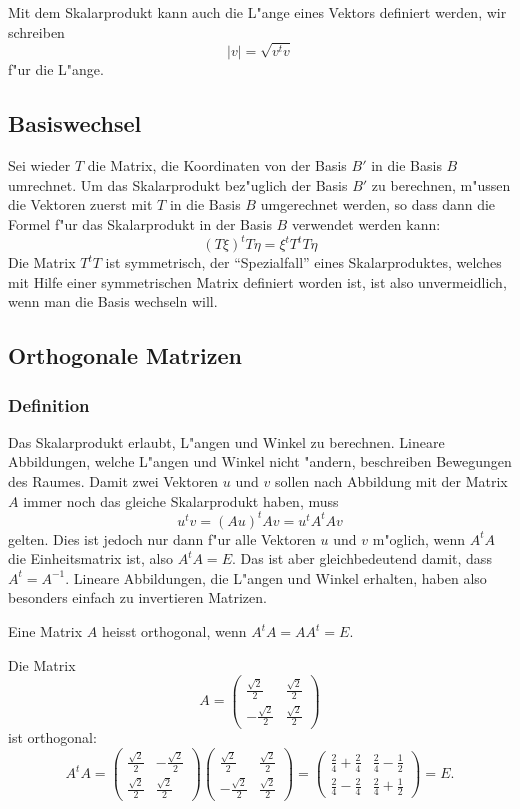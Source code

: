 Mit dem Skalarprodukt kann auch die L"ange eines Vektors definiert 
werden, wir schreiben
\[
|v|=\sqrt{v^tv}
\]
f"ur die L"ange.

\subsection{Basiswechsel}
Sei wieder $T$ die Matrix, die Koordinaten von der Basis $B'$ in die
Basis $B$ umrechnet.
Um das Skalarprodukt bez"uglich der Basis $B'$ zu berechnen,
m"ussen die Vektoren zuerst mit $T$ in die Basis $B$ umgerechnet werden,
so dass dann die Formel f"ur das Skalarprodukt in der Basis $B$
verwendet werden kann:
\[
(T\xi)^tT\eta=\xi^tT^tT\eta
\]
Die Matrix $T^tT$ ist symmetrisch, der ``Spezialfall'' eines Skalarproduktes,
welches mit Hilfe einer symmetrischen Matrix definiert worden ist,
ist also unvermeidlich, wenn man die Basis wechseln will.

\subsection{Orthogonale Matrizen}
\subsubsection{Definition}
Das Skalarprodukt erlaubt, L"angen und Winkel zu berechnen. 
Lineare Abbildungen, welche L"angen und Winkel nicht "andern, beschreiben
Bewegungen des Raumes. Damit zwei Vektoren $u$ und $v$ sollen nach Abbildung
mit der Matrix $A$ immer noch das gleiche Skalarprodukt haben, muss
\[
u^tv=(Au)^tAv=u^tA^tAv
\]
gelten. Dies ist jedoch nur dann f"ur alle Vektoren $u$ und $v$ m"oglich,
wenn $A^tA$ die Einheitsmatrix ist, also $A^tA=E$. Das ist aber gleichbedeutend
damit, dass $A^t=A^{-1}$. Lineare Abbildungen, die L"angen und
Winkel erhalten, haben also besonders einfach zu invertieren Matrizen.

\begin{definition}
Eine Matrix $A$ heisst orthogonal, wenn $A^tA=AA^t=E$.
\end{definition}

\begin{beispiel}
Die Matrix 
\[
A=
\begin{pmatrix}
\frac{\sqrt{2}}2& \frac{\sqrt{2}}2\\
-\frac{\sqrt{2}}2& \frac{\sqrt{2}}2
\end{pmatrix}
\]
ist orthogonal:
\[
A^tA=
\begin{pmatrix}
\frac{\sqrt{2}}2&-\frac{\sqrt{2}}2\\
\frac{\sqrt{2}}2& \frac{\sqrt{2}}2
\end{pmatrix}
\begin{pmatrix}
\frac{\sqrt{2}}2& \frac{\sqrt{2}}2\\
-\frac{\sqrt{2}}2& \frac{\sqrt{2}}2
\end{pmatrix}
=
\begin{pmatrix}
\frac24+\frac24&\frac24-\frac12\\
\frac24-\frac24&\frac24+\frac12
\end{pmatrix}
=E.
\]
\end{beispiel}

